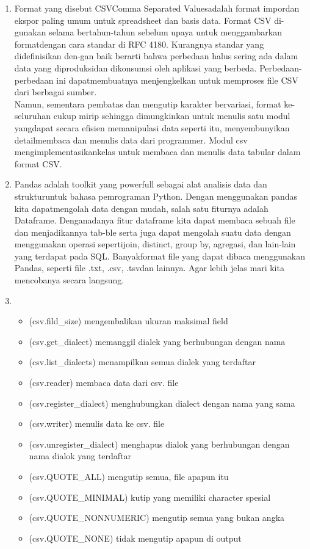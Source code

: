 \documentclass[12pt]{article}
\begin{document}
\begin{enumerate}
		\item Format  yang  disebut  CSVComma Separated Valuesadalah  format  impordan ekspor paling umum untuk spreadsheet dan basis data.  Format CSV di-gunakan selama bertahun-tahun sebelum upaya untuk menggambarkan formatdengan cara standar di RFC 4180.  Kurangnya standar yang didefinisikan den-gan baik berarti bahwa perbedaan halus sering ada dalam data yang diproduksidan  dikonsumsi  oleh  aplikasi  yang  berbeda.   Perbedaan-perbedaan  ini  dapatmembuatnya menjengkelkan untuk memproses file CSV dari berbagai sumber.\\Namun,  sementara  pembatas  dan  mengutip  karakter  bervariasi,  format  ke-seluruhan cukup mirip sehingga dimungkinkan untuk menulis satu modul yangdapat  secara  efisien  memanipulasi  data  seperti  itu,  menyembunyikan  detailmembaca dan menulis data dari programmer.  Modul csv mengimplementasikankelas untuk membaca dan menulis data tabular dalam format CSV.
		\item Pandas adalah toolkit yang powerfull sebagai alat analisis data dan strukturuntuk bahasa pemrograman Python.  Dengan menggunakan pandas kita dapatmengolah data dengan mudah, salah satu fiturnya adalah Dataframe.  Denganadanya fitur dataframe kita dapat membaca sebuah file dan menjadikannya tab-ble serta juga dapat mengolah suatu data dengan menggunakan operasi sepertijoin, distinct, group by, agregasi, dan lain-lain yang terdapat pada SQL. Banyakformat file yang dapat dibaca menggunakan Pandas, seperti file .txt, .csv, .tsvdan lainnya.  Agar lebih jelas mari kita mencobanya secara langsung.
		\item
		
		\begin{itemize}
			\item (csv.fild\_size) mengembalikan ukuran maksimal field
			\item (csv.get\_dialect) memanggil dialek yang berhubungan dengan nama
			\item (csv.list\_dialects) menampilkan semua dialek yang terdaftar
			\item (csv.reader) membaca data dari csv. file
			\item (csv.register\_dialect) menghubungkan dialect dengan nama yang sama
			\item (csv.writer) menulis data ke csv. file
			\item (csv.unregister\_dialect) menghapus dialok yang berhubungan dengan nama dialok yang terdaftar
			\item (csv.QUOTE\_ALL) mengutip semua, file apapun itu
			\item (csv.QUOTE\_MINIMAL) kutip yang memiliki character spesial
			\item (csv.QUOTE\_NONNUMERIC) mengutip semua yang bukan angka
			\item (csv.QUOTE\_NONE) tidak mengutip apapun di output
			

\end{itemize}
\end{enumerate}
\end{document}
